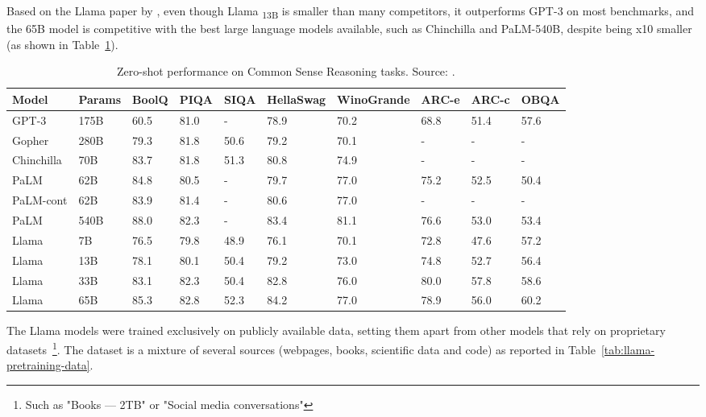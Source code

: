 Based on the Llama paper by \textcite{touvron2023llama}, even though Llama \textsubscript{13B} is smaller than many competitors, it outperforms GPT-3 on most benchmarks, and the 65B model is competitive with the best large language models available, such as Chinchilla and PaLM-540B, despite being x10 smaller (as shown in Table~\ref{tab:llama-zero-shot-performance}).

\begin{table}[htbp]
	\centering
	\scriptsize
	\begin{tabularx}{\textwidth}{@{}lXXXXXXXXX@{}}
		\toprule
		Model      & Params & BoolQ & PIQA & SIQA & HellaSwag & WinoGrande & ARC-e & ARC-c & OBQA \\
		\midrule
		GPT-3      & 175B   & 60.5  & 81.0 & -    & 78.9      & 70.2       & 68.8  & 51.4  & 57.6 \\
		Gopher     & 280B   & 79.3  & 81.8 & 50.6 & 79.2      & 70.1       & -     & -     & -    \\
		Chinchilla & 70B    & 83.7  & 81.8 & 51.3 & 80.8      & 74.9       & -     & -     & -    \\
		PaLM       & 62B    & 84.8  & 80.5 & -    & 79.7      & 77.0       & 75.2  & 52.5  & 50.4 \\
		PaLM-cont  & 62B    & 83.9  & 81.4 & -    & 80.6      & 77.0       & -     & -     & -    \\
		PaLM       & 540B   & 88.0  & 82.3 & -    & 83.4      & 81.1       & 76.6  & 53.0  & 53.4 \\
		\addlinespace
		Llama      & 7B     & 76.5  & 79.8 & 48.9 & 76.1      & 70.1       & 72.8  & 47.6  & 57.2 \\
		Llama      & 13B    & 78.1  & 80.1 & 50.4 & 79.2      & 73.0       & 74.8  & 52.7  & 56.4 \\
		Llama      & 33B    & 83.1  & 82.3 & 50.4 & 82.8      & 76.0       & 80.0  & 57.8  & 58.6 \\
		Llama      & 65B    & 85.3  & 82.8 & 52.3 & 84.2      & 77.0       & 78.9  & 56.0  & 60.2 \\
		\bottomrule
	\end{tabularx}
	\caption{Zero-shot performance on Common Sense Reasoning tasks. Source: \textcite{touvron2023llama}.}
	\label{tab:llama-zero-shot-performance}
\end{table}

The Llama models were trained exclusively on publicly available data, setting them apart from other models that rely on proprietary datasets~\footnote{Such as "Books --- 2TB" or "Social media conversations"}.
The dataset is a mixture of several sources (webpages, books, scientific data and code) as reported in Table~\ref{tab:llama-pretraining-data}.

